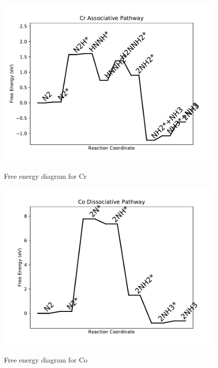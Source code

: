\documentclass{article}
\begin{document}
\begin{figure}
\includegraphics[width=1\linewidth]{data/plots/Cr_associative.pdf}
\label{fig:Cr_associative}
\caption{Free energy diagram for Cr}
\end{figure}

\begin{figure}
\includegraphics[width=1\linewidth]{data/plots/Co_dissociative.pdf}
\label{fig:Co_dissociative}
\caption{Free energy diagram for Co}
\end{figure}
\end{document}
